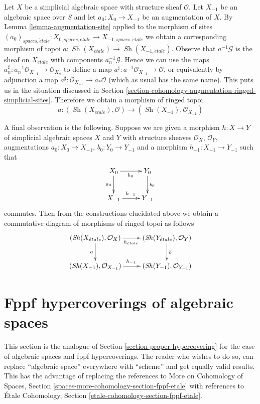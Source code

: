 \documentclass{stacks-project}
\theoremstyle{plain}
\theoremstyle{definition}
\theoremstyle{remark}
\numberwithin{equation}{subsection}
\def\Sh{\mathop{\mathit{Sh}}\nolimits}
\def\etale{{\acute{e}tale}}
\begin{document}
\medskip\noindent
Let $X$ be a simplicial algebraic space with structure sheaf $\mathcal{O}$.
Let $X_{-1}$ be an algebraic space over $S$ and let $a_0 : X_0 \to X_{-1}$
be an augmentation of $X$. By
Lemma \ref{lemma-augmentation-site}
applied to the morphism of sites
$(a_0)_{spaces, \etale} :
X_{0, spaces, \etale} \to X_{-1, spaces, \etale}$
we obtain a corresponding morphism of topoi
$a : \Sh(X_\etale) \to \Sh(X_{-1, \etale})$.
Observe that $a^{-1}\mathcal{G}$ is the sheaf on
$X_\etale$ with components $a_n^{-1}\mathcal{G}$. Hence we can use the maps
$a_n^\sharp : a_n^{-1}\mathcal{O}_{X_{-1}} \to \mathcal{O}_{X_n}$ to define
a map $a^\sharp : a^{-1}\mathcal{O}_{X_{-1}} \to \mathcal{O}$, or equivalently
by adjunction a map $a^\sharp : \mathcal{O}_{X_{-1}} \to a_*\mathcal{O}$
(which as usual has the same name). This puts us in the situation
discussed in
Section \ref{section-cohomology-augmentation-ringed-simplicial-sites}.
Therefore we obtain a morphism of ringed topoi
$$
a :
(\Sh(X_\etale), \mathcal{O})
\longrightarrow
(\Sh(X_{-1}), \mathcal{O}_{X_{-1}})
$$

\medskip\noindent
A final observation is the following. Suppose we are given a morphism
$h : X \to Y$ of simplicial algebraic spaces $X$ and $Y$ with structure sheaves
$\mathcal{O}_X$, $\mathcal{O}_Y$, augmentations
$a_0 : X_0 \to X_{-1}$, $b_0 : Y_0 \to Y_{-1}$ and a morphism
$h_{-1} : X_{-1} \to Y_{-1}$ such that
$$
\xymatrix{
X_0 \ar[r]_{h_0} \ar[d]_{a_0} & Y_0 \ar[d]^{b_0} \\
X_{-1} \ar[r]^{h_{-1}} & Y_{-1}
}
$$
commutes. Then from the constructions elucidated above
we obtain a commutative diagram of morphisms of ringed topoi as follows
$$
\xymatrix{
(\Sh(X_\etale), \mathcal{O}_X) \ar[r]_{h_\etale} \ar[d]_a &
(\Sh(Y_\etale), \mathcal{O}_Y) \ar[d]^b \\
(\Sh(X_{-1}), \mathcal{O}_{X_{-1}}) \ar[r]^{h_{-1}} &
(\Sh(Y_{-1}), \mathcal{O}_{Y_{-1}})
}
$$




\section{Fppf hypercoverings of algebraic spaces}
\label{section-fppf-hypercovering}

\noindent
This section is the analogue of Section \ref{section-proper-hypercovering}
for the case of algebraic spaces and fppf hypercoverings.
The reader who wishes to do so, can replace ``algebraic space''
everywhere with ``scheme'' and get equally valid results.
This has the advantage of replacing the references to
More on Cohomology of Spaces, Section
\ref{spaces-more-cohomology-section-fppf-etale}
with references to
\'Etale Cohomology, Section \ref{etale-cohomology-section-fppf-etale}.
\end{document}
